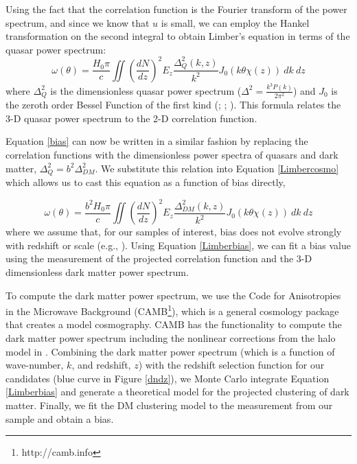 \documentclass[apj, numberedappendix]{emulateapj}
\begin{document}
Using the fact that the correlation function is the Fourier transform of the power spectrum, and since we know that $u$ is small, we can employ the Hankel transformation on the second integral to obtain Limber's equation in terms of the quasar power spectrum:
\begin{equation}\label{Limbercosmo}
\omega(\theta) = \frac{H_0\pi}{c}\iint \left(\frac{dN}{dz}\right)^2E_z \frac{\Delta_Q^2(k,z)}{k^2}J_0(k\theta\chi(z))\ dk\ dz
\end{equation}
where $\Delta_Q^2$ is the dimensionless quasar power spectrum ($\Delta^2 = \frac{k^3P(k)}{2\pi^2}$) and $J_0$ is the zeroth order Bessel Function of the first kind (\citealt{Bonometto2002}; \citealt{Myers2007}; \citealt{Brewer2008}). This formula relates the 3-D quasar power spectrum to the 2-D correlation function. 

Equation \eqref{bias} can now be written in a similar fashion by replacing the correlation functions with the dimensionless power spectra of quasars and dark matter, $\Delta_Q^2 = b^2 \Delta_{DM}^2$. We substitute this relation into Equation \eqref{Limbercosmo} which allows us to cast this equation as a function of bias directly,

\begin{equation}\label{Limberbias}
\omega(\theta) = \frac{b^2H_0\pi}{c}\iint \left(\frac{dN}{dz}\right)^2E_z \frac{\Delta_{DM}^2(k,z)}{k^2}J_0(k\theta\chi(z))\ dk\ dz
\end{equation}
where we assume that, for our samples of interest, bias does not evolve strongly with redshift or scale (e.g., \citealt{Myers2007}). Using Equation \eqref{Limberbias}, we can fit a bias value using the measurement of the projected correlation function and the 3-D dimensionless dark matter power spectrum.

To compute the dark matter power spectrum, we use the Code for Anisotropies in the Microwave Background (CAMB\footnote{http://camb.info}), which is a general cosmology package that creates a model cosmography. CAMB has the functionality to compute the dark matter power spectrum including the nonlinear corrections from the halo model in \citet{Smith2003}. Combining the dark matter power spectrum (which is a function of wave-number, $k$, and redshift, $z$) with the redshift selection function for our candidates (blue curve in Figure \ref{dndz}), we Monte Carlo integrate Equation \eqref{Limberbias} and generate a theoretical model for the projected clustering of dark matter. Finally, we fit the DM clustering model to the measurement from our sample and obtain a bias. 
 
\end{document}
